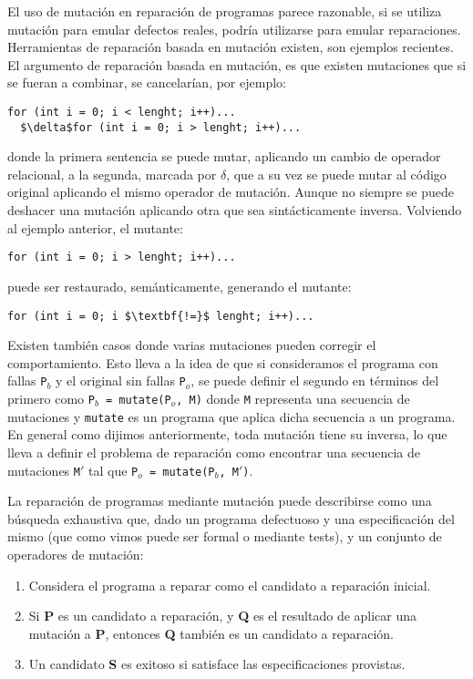 El uso de mutaci\'on en reparaci\'on de programas parece razonable, si se utiliza mutaci\'on para emular defectos reales, podr\'ia utilizarse para emular reparaciones. Herramientas de reparaci\'on basada en mutaci\'on existen, \cite{bibliography.repair.mutation.DebroyW10, bibliography.repair.mutation.AlloyWang18} son ejemplos recientes. El argumento de reparaci\'on basada en mutaci\'on, es que existen mutaciones que si se fueran a combinar, se cancelar\'ian, por ejemplo:
\begin{lstlisting}[mathescape=true]
  for (int i = 0; i < lenght; i++)...
  $\delta$for (int i = 0; i > lenght; i++)...
\end{lstlisting}
donde la primera sentencia se puede mutar, aplicando un cambio de operador relacional, a la segunda, marcada por $\delta$, que a su vez se puede mutar al c\'odigo original aplicando el mismo operador de mutaci\'on. Aunque no siempre se puede deshacer una mutaci\'on aplicando otra que sea sint\'acticamente inversa. 
Volviendo al ejemplo anterior, el mutante:
\begin{lstlisting}[mathescape=true]
  for (int i = 0; i > lenght; i++)...
\end{lstlisting}
puede ser restaurado, sem\'anticamente, generando el mutante:
\begin{lstlisting}[mathescape=true]
  for (int i = 0; i $\textbf{!=}$ lenght; i++)...
\end{lstlisting}
Existen tambi\'en casos donde varias mutaciones pueden corregir el comportamiento. Esto lleva a la idea de que si consideramos el programa con fallas \texttt{P$_b$} y el original sin fallas \texttt{P$_o$}, se puede definir el segundo en t\'erminos del primero como \texttt{P$_b$ = mutate(P$_o$, M)} donde \texttt{M} representa una secuencia de mutaciones y \texttt{mutate} es un programa que aplica dicha secuencia a un programa. En general como dijimos anteriormente, toda mutaci\'on tiene su inversa, lo que lleva a definir el problema de reparaci\'on como encontrar una secuencia de mutaciones \texttt{M$\prime$} tal que \texttt{P$_o$ = mutate(P$_b$, M$\prime$)}.

La reparaci\'on de programas mediante mutaci\'on puede describirse como una b\'usqueda exhaustiva que, dado un programa defectuoso y una especificaci\'on del mismo (que como vimos puede ser formal o mediante tests), y un conjunto de operadores de mutaci\'on:
\begin{enumerate}
	\item Considera el programa a reparar como el candidato a reparaci\'on inicial.
	
	\item Si \textbf{P} es un candidato a reparaci\'on, y \textbf{Q} es el resultado de aplicar una mutaci\'on a \textbf{P}, entonces \textbf{Q} tambi\'en es un candidato a reparaci\'on.
	
	\item  Un candidato \textbf{S} es exitoso si satisface las especificaciones provistas.
\end{enumerate}

